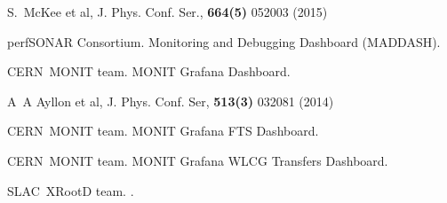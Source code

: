 \begin{thebibliography}{}
S.~McKee et al, J. Phys. Conf. Ser., {\bf 664(5)} 052003 (2015)


perfSONAR Consortium.
 {Monitoring and Debugging Dashboard (MADDASH)}.

CERN~{MONIT} team.
 {MONIT} {Grafana} {Dashboard}.

A~A Ayllon et al, 
J. Phys. Conf. Ser, {\bf 513(3)} 032081 (2014)

CERN~{MONIT} team.
 {MONIT} {Grafana} {FTS} {Dashboard}.
 
CERN~{MONIT} team.
 {MONIT} {Grafana} {WLCG} {Transfers} {Dashboard}.


SLAC~{XRootD} team.
.








\end{thebibliography}
